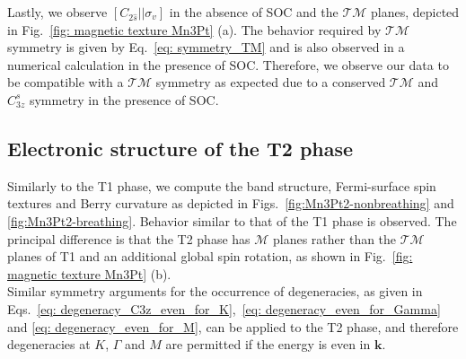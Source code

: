 Lastly, we observe $[C_{2\hat{s}}||\sigma_v]$ in the absence of SOC and the $\mathcal{TM}$ planes, depicted in Fig.~\ref{fig: magnetic texture Mn3Pt} (a). The behavior required by $\mathcal{TM}$ symmetry is given by Eq.~\eqref{eq: symmetry_TM} and is also observed in a numerical calculation in the presence of SOC. Therefore, we observe our data to be compatible with a $\mathcal{TM}$ symmetry as expected due to a conserved $\mathcal{TM}$ and $C_{3z}^s$ symmetry in the presence of SOC.  
\FloatBarrier
\subsection{Electronic structure of the T2 phase}
Similarly to the T1 phase, we compute the band structure, Fermi-surface spin textures and Berry curvature as depicted in Figs.~\ref{fig:Mn3Pt2-nonbreathing} and \ref{fig:Mn3Pt2-breathing}.
Behavior similar to that of the T1 phase is observed. The principal difference is that the T2 phase has $\mathcal{M}$ planes rather than the $\mathcal{TM}$ planes of T1 and an additional global spin rotation, as shown in Fig.~\ref{fig: magnetic texture Mn3Pt} (b). 
\\
Similar symmetry arguments for the occurrence of degeneracies, as given in Eqs.~\eqref{eq: degeneracy_C3z_even_for_K},~\eqref{eq: degeneracy_even_for_Gamma} and \eqref{eq: degeneracy_even_for_M}, can be applied to the T2 phase, and therefore degeneracies at $K$, $\Gamma$ and $M$ are permitted if the energy is even in $\mathbf{k}$.

